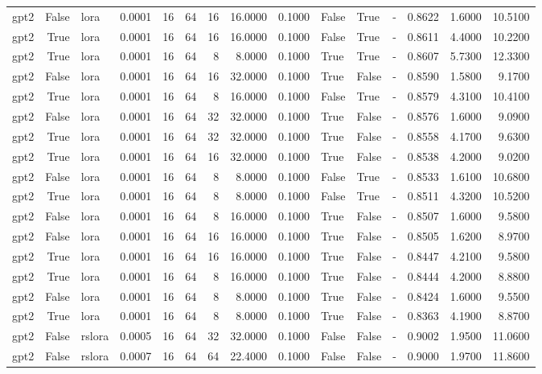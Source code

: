 \begin{tabular}{lrlrrrrrrlllrrr}
gpt2 & False & lora & 0.0001 & 16 & 64 & 16 & 16.0000 & 0.1000 & False & True & - & 0.8622 & 1.6000 & 10.5100 \\
gpt2 & True & lora & 0.0001 & 16 & 64 & 16 & 16.0000 & 0.1000 & False & True & - & 0.8611 & 4.4000 & 10.2200 \\
gpt2 & True & lora & 0.0001 & 16 & 64 & 8 & 8.0000 & 0.1000 & True & True & - & 0.8607 & 5.7300 & 12.3300 \\
gpt2 & False & lora & 0.0001 & 16 & 64 & 16 & 32.0000 & 0.1000 & True & False & - & 0.8590 & 1.5800 & 9.1700 \\
gpt2 & True & lora & 0.0001 & 16 & 64 & 8 & 16.0000 & 0.1000 & False & True & - & 0.8579 & 4.3100 & 10.4100 \\
gpt2 & False & lora & 0.0001 & 16 & 64 & 32 & 32.0000 & 0.1000 & True & False & - & 0.8576 & 1.6000 & 9.0900 \\
gpt2 & True & lora & 0.0001 & 16 & 64 & 32 & 32.0000 & 0.1000 & True & False & - & 0.8558 & 4.1700 & 9.6300 \\
gpt2 & True & lora & 0.0001 & 16 & 64 & 16 & 32.0000 & 0.1000 & True & False & - & 0.8538 & 4.2000 & 9.0200 \\
gpt2 & False & lora & 0.0001 & 16 & 64 & 8 & 8.0000 & 0.1000 & False & True & - & 0.8533 & 1.6100 & 10.6800 \\
gpt2 & True & lora & 0.0001 & 16 & 64 & 8 & 8.0000 & 0.1000 & False & True & - & 0.8511 & 4.3200 & 10.5200 \\
gpt2 & False & lora & 0.0001 & 16 & 64 & 8 & 16.0000 & 0.1000 & True & False & - & 0.8507 & 1.6000 & 9.5800 \\
gpt2 & False & lora & 0.0001 & 16 & 64 & 16 & 16.0000 & 0.1000 & True & False & - & 0.8505 & 1.6200 & 8.9700 \\
gpt2 & True & lora & 0.0001 & 16 & 64 & 16 & 16.0000 & 0.1000 & True & False & - & 0.8447 & 4.2100 & 9.5800 \\
gpt2 & True & lora & 0.0001 & 16 & 64 & 8 & 16.0000 & 0.1000 & True & False & - & 0.8444 & 4.2000 & 8.8800 \\
gpt2 & False & lora & 0.0001 & 16 & 64 & 8 & 8.0000 & 0.1000 & True & False & - & 0.8424 & 1.6000 & 9.5500 \\
gpt2 & True & lora & 0.0001 & 16 & 64 & 8 & 8.0000 & 0.1000 & True & False & - & 0.8363 & 4.1900 & 8.8700 \\
gpt2 & False & rslora & 0.0005 & 16 & 64 & 32 & 32.0000 & 0.1000 & False & False & - & 0.9002 & 1.9500 & 11.0600 \\
gpt2 & False & rslora & 0.0007 & 16 & 64 & 64 & 22.4000 & 0.1000 & False & False & - & 0.9000 & 1.9700 & 11.8600 \\

\end{tabular}
